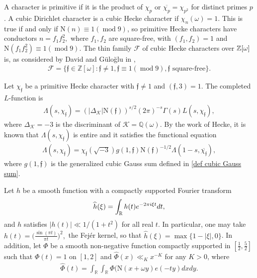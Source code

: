 \documentclass[11pt]{amsart}
\newcommand{\norm}{\mathrm{N}}
\numberwithin{equation}{section}
\newcommand{\mymod}[1]{(\operatorname{mod} #1)}
\theoremstyle{remark}
\begin{document}
A character is primitive if it is the product of $\chi_p$ or $\overline{\chi_p}=\chi_{p^2}$ for distinct primes $p$. A cubic Dirichlet character is a cubic Hecke character if $\chi_n(\omega)=1.$ This is true if and only if $\norm(n)\equiv 1\mymod{9}$, so primitive Hecke characters have conductors $n=f_1f_2^2,$ where $f_1, f_2$ are square-free, with $(f_1, f_2)=1$ and  $\norm(f_1f_2^2)\equiv1\mymod{9}.$ The thin family $\mathcal{F}$ of cubic Hecke characters over $\Bbb{Z}[\omega]$ is, as considered by David and G\"{u}lo\u{g}lu in \cite{DG},
\begin{align}
    \label{def of thin family}
    \mathcal{F}=\{ \mathfrak{f}\in \mathbb{Z}[\omega] : \mathfrak{f}\ne1, \mathfrak{f}\equiv1\mymod{9}, \mathfrak{f} \text{ square-free} \}.
\end{align}

Let $\chi_\mathfrak{f}$ be a primitive Hecke character with $\mathfrak{f}\ne1$ and $(\mathfrak{f},3)=1.$ The completed $L$-function is 
\begin{align*}
    \Lambda(s, \chi_\mathfrak{f})=(|\Delta_\mathcal{K}|\norm(\mathfrak{f}))^{s/2}(2\pi)^{-s}\Gamma(s)L(s, \chi_\mathfrak{f}),
\end{align*}
where $\Delta_\mathcal{K}=-3$ is the discriminant of $\mathcal{K}=\mathbb{Q}(\omega)$. By the work of Hecke, it is known that $\Lambda(s, \chi_\mathfrak{f})$ is entire and it satisfies the functional equation
\begin{align*}
    \Lambda(s, \chi_\mathfrak{f})
    =
    \chi_\mathfrak{f}(\sqrt{-3})g(1, \mathfrak{f}) \norm(\mathfrak{f})^{-1/2}\Lambda(1-s, \overline{\chi_\mathfrak{f}}),
\end{align*}
where $g(1, \mathfrak{f})$ is the generalized cubic Gauss sum defined in \eqref{def cubic Gauss sum}.

Let $h$ be a smooth function with a compactly supported Fourier transform
$$
\widehat{h}(\xi)= \int_{\Bbb{R}} h(t) e^{-2\pi i\xi t}dt,
$$
and $h$ satisfies $|h(t)| \ll 1/(1+t^2)$ for all real $t$. In particular, one may take
$\displaystyle 
h(t) = \Big( \frac{\sin(\pi t)}{\pi t} \Big)^2,
$
the Fej\'er kernel, so that $\widehat{h}(\xi) =\max\{1 - |\xi|, 0\}$. In addition, let $\Phi$ be a smooth non-negative function compactly supported in $[\frac{1}{2},\frac{5}{2}]$ such that $\Phi(t)=1$ on $[1,2]$ and $\widehat{\Phi}(x)\ll_K x^{-K}$ for any $K>0$, where
\begin{align}\label{widehat Phi}
    \widehat{\Phi}(t)=\int_\mathbb{R}\int_\mathbb{R}\Phi(\norm(x+\omega y)e(-ty)dxdy.
\end{align}
\end{document}
